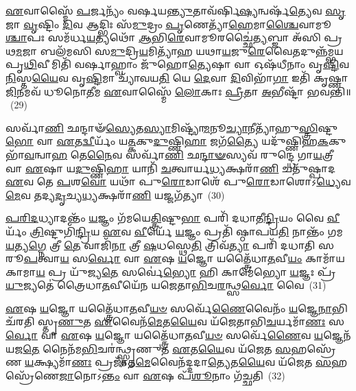 \-\ul{𑌏}\-𑌵𑌾𑌸𑍍𑌮𑍈᳴ \ul{𑌪}\-𑌰𑍍𑌜𑌨𑍍𑌯𑌂᳴ 𑌵𑌰𑍍\mbox{}𑌷𑌯\-\ul{𑌨𑍍𑌤𑍍𑌯𑍁}\-𑌤𑌾𑌵᳴𑌰𑍍\mbox{}𑌷𑌿\-\ul{𑌷𑍍𑌯}\-𑌨𑍍𑌵𑌰𑍍\mbox{}𑌷᳴\-\ul{𑌤𑍍𑌯𑍇}\-𑌵 \ul{𑌸𑍃}\-𑌜𑌾 \ul{𑌵𑍃}\-𑌷𑍍𑌟𑌿𑌂 \ul{𑌦𑌿}\-𑌵 𑌆𑌦𑍍𑌭𑌿𑌃 𑌸᳴\-\ul{𑌮𑍁}\-𑌦𑍍𑌰𑌂 \ul{𑌪𑍃}\-𑌣𑍇𑌤𑍍𑌯𑌾᳴\-\ul{𑌹𑍇}\-𑌮𑌾\-\ul{𑌶𑍍𑌚𑍈}\-𑌵𑌾𑌮𑍂\-\ul{𑌶𑍍𑌚𑌾}\-𑌪𑌃 𑌸𑌮᳴𑌰𑍍𑌧\-\ul{𑌯}\-𑌤𑍍𑌯𑌥𑍋᳴ \ul{𑌆}\-𑌭𑌿\-\ul{𑌰𑍇}\-𑌵𑌾𑌮𑍂𑌰𑌚𑍍𑌛𑍈॑\-\ul{𑌤𑍍𑌯}\-𑌬𑍍𑌜𑌾 𑌅᳴𑌸𑌿 𑌪𑍍𑌰𑌥\-\ul{𑌮}\-𑌜𑌾 𑌬𑌲᳴𑌮𑌸𑌿 𑌸\-\ul{𑌮𑍁}\-𑌦𑍍𑌰𑌿\-\ul{𑌯}\-𑌮𑌿𑌤𑍍𑌯𑌾᳴𑌹 𑌯𑌥𑌾\-\ul{𑌯}\-𑌜𑍁\-\ul{𑌰𑍇}\-𑌵𑍈𑌤𑌦𑍁𑌨𑍍𑌨᳴𑌮𑍍𑌭𑌯 𑌪𑍃\-\ul{𑌥𑌿}\-𑌵𑍀𑌮𑌿𑌤𑌿᳴ 𑌵𑌰𑍍\mbox{}\-\ul{𑌷𑌾}\-𑌹𑍍𑌵𑌾𑌂 𑌜𑍁᳴𑌹𑍋\-\ul{𑌤𑍍𑌯𑍇}\-𑌷𑌾 𑌵𑌾 𑌓𑌷᳴𑌧𑍀𑌨𑌾𑌂 𑌵𑍃\-\ul{𑌷𑍍𑌟𑌿}\-𑌵\-\ul{𑌨𑌿}\-𑌸𑍍𑌤\-\ul{𑌯𑍈}\-𑌵 𑌵𑍃\-\ul{𑌷𑍍𑌟𑌿}\-𑌮𑌾 𑌚𑍍𑌯𑌾᳴𑌵𑌯\-\ul{𑌤𑌿} 𑌯𑍇 \ul{𑌦𑍇}\-𑌵𑌾 \ul{𑌦𑌿}\-𑌵𑌿𑌭𑌾᳴\-\ul{𑌗𑌾} 𑌇𑌤𑌿᳴ 𑌕𑍃𑌷𑍍𑌣𑌾\-\ul{𑌜𑌿}\-𑌨𑌮𑌵᳴ 𑌧𑍂𑌨𑍋\-\ul{𑌤𑍀}\-𑌮 \ul{𑌏}\-𑌵𑌾𑌸𑍍𑌮𑍈᳴ \ul{𑌲𑍋}\-𑌕𑌾𑌃 \ul{𑌪𑍍𑌰𑍀}\-𑌤𑌾 \ul{𑌅}\-𑌭𑍀𑌷𑍍𑌟𑌾᳴ 𑌭𑌵𑌨𑍍𑌤𑌿॥~(29)

{\anuvakamend[{\-\ul{𑌅}\-\-\ul{𑌸𑍍𑌮𑍈} \ul{𑌧𑌾}\-\-\ul{𑌵}\-\-\ul{𑌤𑌿} 𑌤𑌾 𑌵𑌾 𑌏𑌕᳴𑌵𑌿𑍞𑌶𑌤𑌿𑌶𑍍𑌚}]}%

𑌸𑌰𑍍𑌵𑌾᳴\-\ul{𑌣𑌿} 𑌛𑌨𑍍𑌦𑌾𑍟᳴\-\ul{𑌸𑍍𑌯𑍇}\-𑌤\-\ul{𑌸𑍍𑌯𑌾}\-𑌮𑌿𑌷𑍍𑌟𑍍𑌯𑌾᳴\-\ul{𑌮}\-𑌨𑍂\-\ul{𑌚𑍍𑌯𑌾}\-𑌨𑍀𑌤𑍍𑌯𑌾᳴𑌹𑍁\-\ul{𑌸𑍍𑌤𑍍𑌰𑌿}\-𑌷𑍍𑌟𑍁\-\ul{𑌭𑍋} 𑌵𑌾 \ul{𑌏}\-𑌤\-\ul{𑌦𑍍𑌵𑍀}\-𑌰𑍍𑌯𑌂᳴ 𑌯\-\ul{𑌤𑍍𑌕}\-𑌕𑍁\-\ul{𑌦𑍁}\-𑌷𑍍𑌣𑌿\-\ul{𑌹𑌾} 𑌜𑌗᳴\-\ul{𑌤𑍍𑌯𑍈} 𑌯𑌦𑍁᳴𑌷𑍍𑌣𑌿𑌹\-\ul{𑌕}\-𑌕𑍁𑌭𑌾᳴\-\ul{𑌵}\-𑌨𑍍𑌵𑌾\-\ul{𑌹} 𑌤𑍇\-\ul{𑌨𑍈}\-𑌵 𑌸𑌰𑍍𑌵𑌾᳴\-\ul{𑌣𑌿} 𑌛\-\ul{𑌨𑍍𑌦𑌾}\-\-\ul{𑍟}\-𑌸𑍍𑌯𑌵᳴ 𑌰𑍁𑌨𑍍𑌦𑍍𑌧𑍇 𑌗𑌾\-\ul{𑌯}\-𑌤𑍍𑌰𑍀 𑌵𑌾 \ul{𑌏}\-𑌷𑌾 𑌯\-\ul{𑌦𑍁}\-𑌷𑍍𑌣𑌿\-\ul{𑌹𑌾} 𑌯𑌾𑌨𑌿᳴ \ul{𑌚}\-𑌤𑍍𑌵𑌾𑌰𑍍𑌯\-\ul{𑌧𑍍𑌯}\-𑌕𑍍𑌷𑌰𑌾᳴\-\ul{𑌣𑌿} 𑌚𑌤𑍁᳴𑌷𑍍𑌪𑌾𑌦 \ul{𑌏}\-𑌵 𑌤𑍇 \ul{𑌪}\-𑌶\-\ul{𑌵𑍋} 𑌯𑌥𑌾᳴ 𑌪𑍁\-\ul{𑌰𑍋}\-𑌡𑌾𑌶𑍇᳴ 𑌪𑍁\-\ul{𑌰𑍋}\-𑌡𑌾𑌶𑍋\-𑌽\-\ul{𑌧𑍍𑌯𑍇}\-𑌵\-\ul{𑌮𑍇}\-𑌵 𑌤𑌦𑍍𑌯\-\ul{𑌦𑍃}\-𑌚𑍍𑌯\-\ul{𑌧𑍍𑌯}\-𑌕𑍍𑌷𑌰𑌾᳴\-\ul{𑌣𑌿} 𑌯𑌜𑍍𑌜𑌗᳴𑌤𑍍𑌯𑌾~(30)

\-\ul{𑌪}\-\-\ul{𑌰𑌿}\-\-\ul{𑌦}\-𑌧𑍍𑌯𑌾𑌦𑌨𑍍𑌤𑌂᳴ \ul{𑌯}\-𑌜𑍍𑌞𑌂 𑌗᳴𑌮𑌯𑍇\-\ul{𑌤𑍍𑌤𑍍𑌰𑌿}\-𑌷𑍍𑌟𑍁\-\ul{𑌭𑌾} 𑌪𑌰𑌿᳴ 𑌦𑌧𑌾𑌤𑍀\-\ul{𑌨𑍍𑌦𑍍𑌰𑌿}\-𑌯𑌂 𑌵𑍈 \ul{𑌵𑍀}\-𑌰𑍍𑌯𑌂᳴ \ul{𑌤𑍍𑌰𑌿}\-𑌷𑍍𑌟𑍁𑌗𑌿᳴\-\ul{𑌨𑍍𑌦𑍍𑌰𑌿}\-𑌯 \ul{𑌏}\-𑌵 \ul{𑌵𑍀}\-𑌰𑍍𑌯𑍇᳴ \ul{𑌯}\-𑌜𑍍𑌞𑌂 𑌪𑍍𑌰𑌤𑌿᳴ 𑌷𑍍𑌠𑌾𑌪𑌯\-\ul{𑌤𑌿} 𑌨𑌾𑌨𑍍𑌤𑌂᳴ 𑌗𑌮\-\ul{𑌯}\-𑌤𑍍𑌯\-\ul{𑌗𑍍𑌨𑍇} 𑌤𑍍𑌰𑍀 \ul{𑌤𑍇} 𑌵𑌾𑌜𑌿᳴\-\ul{𑌨𑌾} 𑌤𑍍𑌰𑍀 \ul{𑌷}\-𑌧𑌸𑍍𑌥𑍇\-\ul{𑌤𑌿} 𑌤𑍍𑌰𑌿𑌵᳴\-\ul{𑌤𑍍𑌯𑌾} 𑌪𑌰𑌿᳴ 𑌦𑌧𑌾𑌤𑌿 𑌸𑌰𑍂\-\ul{𑌪}\-𑌤𑍍𑌵𑌾\-\ul{𑌯} 𑌸\-\ul{𑌰𑍍𑌵𑍋} 𑌵𑌾 \ul{𑌏}\-𑌷 \ul{𑌯}\-𑌜𑍍𑌞𑍋 𑌯𑌤𑍍𑌤𑍍𑌰𑍈᳴𑌧𑌾\-\ul{𑌤}\-𑌵𑍀\-\ul{𑌯𑌂} 𑌕𑌾𑌮𑌾᳴𑌯𑌕𑌾𑌮𑌾\-\ul{𑌯} 𑌪𑍍𑌰 𑌯𑍁᳴𑌜𑍍𑌯\-\ul{𑌤𑍇} 𑌸𑌰𑍍𑌵𑍇॑\-\ul{𑌭𑍍𑌯𑍋} 𑌹𑌿 𑌕𑌾𑌮𑍇॑𑌭𑍍𑌯𑍋 \ul{𑌯}\-𑌜𑍍𑌞𑌃 𑌪𑍍𑌰᳴\-\ul{𑌯𑍁}\-𑌜𑍍𑌯𑌤𑍇॑ 𑌤𑍍𑌰𑍈𑌧𑌾\-\ul{𑌤}\-𑌵𑍀𑌯𑍇᳴𑌨 𑌯𑌜𑍇𑌤𑌾\-\ul{𑌭𑌿}\-𑌚\-\ul{𑌰}\-𑌨𑍍𑌥𑍍𑌸\-\ul{𑌰𑍍𑌵𑍋} 𑌵𑍈~(31)

\-\ul{𑌏}\-𑌷 \ul{𑌯}\-𑌜𑍍𑌞𑍋 𑌯𑌤𑍍𑌤𑍍𑌰𑍈᳴𑌧𑌾\-\ul{𑌤}\-𑌵𑍀\-\ul{𑌯}\-\-\ul{𑍞} 𑌸𑌰𑍍𑌵𑍇᳴\-\ul{𑌣𑍈}\-𑌵𑍈𑌨𑌂᳴ \ul{𑌯}\-𑌜𑍍𑌞𑍇\-\ul{𑌨𑌾}\-𑌭𑌿 𑌚᳴𑌰𑌤𑌿 𑌸𑍍𑌤𑍃\-\ul{𑌣𑍁}\-𑌤 \ul{𑌏}\-𑌵𑍈𑌨᳴\-\ul{𑌮𑍇}\-𑌤\-\ul{𑌯𑍈}\-𑌵 𑌯᳴𑌜𑍇𑌤𑌾𑌭𑌿\-\ul{𑌚}\-𑌰𑍍𑌯𑌮𑌾᳴\-\ul{𑌣𑌃} 𑌸\-\ul{𑌰𑍍𑌵𑍋} 𑌵𑌾 \ul{𑌏}\-𑌷 \ul{𑌯}\-𑌜𑍍𑌞𑍋 𑌯𑌤𑍍𑌤𑍍𑌰𑍈᳴𑌧𑌾\-\ul{𑌤}\-𑌵𑍀\-\ul{𑌯}\-\-\ul{𑍞} 𑌸𑌰𑍍𑌵𑍇᳴\-\ul{𑌣𑍈}\-𑌵 \ul{𑌯}\-𑌜𑍍𑌞𑍇𑌨᳴ 𑌯𑌜\-\ul{𑌤𑍇} 𑌨𑍈𑌨᳴𑌮\-\ul{𑌭𑌿}\-𑌚𑌰॑𑌨𑍍𑌥𑍍𑌸𑍍𑌤𑍃𑌣𑍁𑌤 \ul{𑌏}\-𑌤\-\ul{𑌯𑍈}\-𑌵 𑌯᳴𑌜𑍇𑌤 \ul{𑌸}\-𑌹𑌸𑍍𑌰𑍇᳴𑌣 \ul{𑌯}\-𑌕𑍍𑌷𑍍𑌯𑌮𑌾᳴\-\ul{𑌣𑌃} 𑌪𑍍𑌰𑌜𑌾᳴𑌤\-\ul{𑌮𑍇}\-𑌵𑍈𑌨᳴𑌦𑍍𑌦𑌦𑌾\-\ul{𑌤𑍍𑌯𑍇}\-𑌤\-\ul{𑌯𑍈}\-𑌵 𑌯᳴𑌜𑍇𑌤 \ul{𑌸}\-𑌹𑌸𑍍𑌰𑍇᳴𑌣𑍇\-\ul{𑌜𑌾}\-𑌨𑍋\-𑌽\-\ul{𑌨𑍍𑌤𑌂} 𑌵𑌾 \ul{𑌏}\-𑌷 𑌪᳴\-\ul{𑌶𑍂}\-𑌨𑌾𑌂 𑌗᳴𑌚𑍍𑌛𑌤𑌿~(32)

